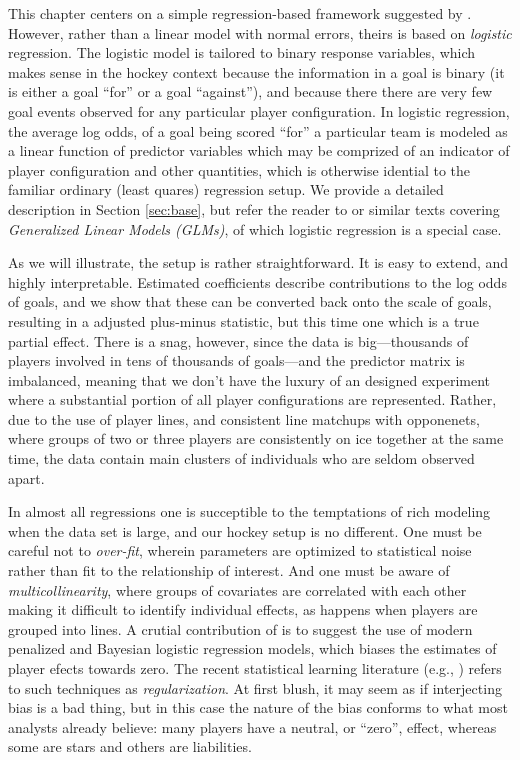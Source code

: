 This chapter centers on a simple regression-based framework suggested by
\cite{gramacy:jensen:taddy:2013}.  However, rather than a linear model
with normal errors, theirs is based on {\em logistic} regression.  The
logistic model is tailored to binary response variables, which makes sense in
the hockey context because the information in a goal is binary (it is either a
goal ``for'' or a goal ``against''), and because there there are very few goal
events observed for any particular player configuration.  In logistic
regression, the average log odds, of a goal being scored ``for'' a particular
team  is modeled as a linear function of predictor variables which may be
comprized of an indicator of player configuration and other quantities, which
is otherwise idential to the familiar ordinary (least quares) regression
setup.  We provide a detailed description in Section \ref{sec:base}, but refer
the reader to \cite{sheather:2009} or similar texts covering {\em Generalized Linear
Models (GLMs)}, of which logistic regression is a special case.

As we will illustrate, the setup is rather straightforward.  It is easy to
extend, and highly interpretable.  Estimated coefficients describe
contributions to the log odds of goals, and we show that these can be
converted back onto the scale of goals, resulting in a adjusted plus-minus
statistic, but this time one which is a true partial effect.  There is a snag,
however, since the data is big---thousands of players involved in tens of
thousands of goals---and the predictor matrix is imbalanced, meaning that we
don't have the luxury of an designed experiment where a substantial portion of
all player configurations are represented.  Rather, due to the use of player
lines, and consistent line matchups with opponenets, where groups of two or
three players are consistently on ice together at the same time, the data
contain main clusters of individuals who are seldom observed apart. 

In almost all regressions one is succeptible to the temptations of rich
modeling when the data set is large, and our hockey setup is no different. One
must be careful not to {\em over-fit}, wherein parameters are optimized to
statistical noise rather than fit to the relationship of interest.  And one
must be aware of {\em multicollinearity}, where groups of covariates are
correlated with each other making it difficult to identify individual effects,
as happens when players are grouped into lines.  A crutial contribution of
\cite{gramacy:jensen:taddy:2013} is to suggest the use of modern penalized and
Bayesian logistic regression models, which biases the estimates of player
efects towards zero.  The recent statistical learning literature (e.g.,
\cite{hastie:tibsh:fried:2001}) refers to such techniques as {\em
regularization}.  At first blush, it may seem as if interjecting bias is a bad
thing, but in this case the nature of the bias conforms to what most analysts
already believe: many players have a neutral, or ``zero'', effect, whereas
some are stars and others are liabilities.  

